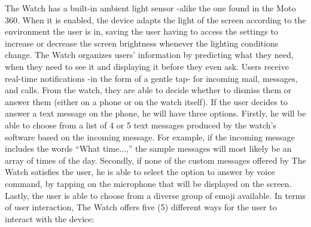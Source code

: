 \documentclass{article}
\begin{document}
The Watch has a built-in ambient light sensor -alike the one found in the Moto 360. When it is enabled, the device adapts the light of the screen according to the environment the user is in, saving the user having to access the settings to increase or decrease the screen brightness whenever the lighting conditions change. 
The Watch organizes users’ information by predicting what they need, when they need to see it and displaying it before they even ask. Users receive real-time notifications -in the form of a gentle tap- for incoming mail, messages, and calls. From the watch, they are able to decide whether to dismiss them or answer them (either on a phone or on the watch itself).  If the user decides to answer a text message on the phone, he will have three options. Firstly, he will be able to choose from a list of 4 or 5 text messages produced by the watch’s software based on the incoming message. For example, if the incoming message includes the words “What time...,” the sample messages will most likely be an array of times of the day. Secondly, if none of the custom messages offered by The Watch satisfies the user, he is able to select the option to answer by voice command, by tapping on the microphone that will be displayed on the screen. Lastly, the user is able to choose from a diverse group of emoji available. 
In terms of user interaction, The Watch offers five (5) different ways for the user to interact with the device: 
\end{document}
